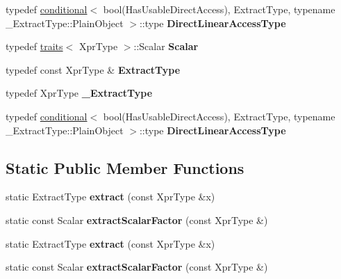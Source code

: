 \begin{DoxyCompactItemize}
typedef \hyperlink{struct_eigen_1_1internal_1_1conditional}{conditional}$<$ bool(Has\+Usable\+Direct\+Access), Extract\+Type, typename \+\_\+\+Extract\+Type\+::\+Plain\+Object $>$\+::type {\bfseries Direct\+Linear\+Access\+Type}
\item 
\mbox{\label{struct_eigen_1_1internal_1_1blas__traits_ac5b1b5ec7dfe61418c561674e47a5cdd}} 
typedef \hyperlink{struct_eigen_1_1internal_1_1traits}{traits}$<$ Xpr\+Type $>$\+::Scalar {\bfseries Scalar}
\item 
\mbox{\label{struct_eigen_1_1internal_1_1blas__traits_a63b33a3d263ccd7709cb758a560ab5b6}} 
typedef const Xpr\+Type \& {\bfseries Extract\+Type}
\item 
\mbox{\label{struct_eigen_1_1internal_1_1blas__traits_ada873c310e824caadb8bd690cac37316}} 
typedef Xpr\+Type {\bfseries \+\_\+\+Extract\+Type}
\item 
\mbox{\label{struct_eigen_1_1internal_1_1blas__traits_a6c3057fb89fc7a4257c3b06e9931438f}} 
typedef \hyperlink{struct_eigen_1_1internal_1_1conditional}{conditional}$<$ bool(Has\+Usable\+Direct\+Access), Extract\+Type, typename \+\_\+\+Extract\+Type\+::\+Plain\+Object $>$\+::type {\bfseries Direct\+Linear\+Access\+Type}
\end{DoxyCompactItemize}
\subsection*{Static Public Member Functions}
\begin{DoxyCompactItemize}
\item 
\mbox{\label{struct_eigen_1_1internal_1_1blas__traits_a05d6cd2ebeac5e92aee45db28b416023}} 
static Extract\+Type {\bfseries extract} (const Xpr\+Type \&x)
\item 
\mbox{\label{struct_eigen_1_1internal_1_1blas__traits_a49bf936917523bf20c00633e30787352}} 
static const Scalar {\bfseries extract\+Scalar\+Factor} (const Xpr\+Type \&)
\item 
\mbox{\label{struct_eigen_1_1internal_1_1blas__traits_a05d6cd2ebeac5e92aee45db28b416023}} 
static Extract\+Type {\bfseries extract} (const Xpr\+Type \&x)
\item 
\mbox{\label{struct_eigen_1_1internal_1_1blas__traits_a49bf936917523bf20c00633e30787352}} 
static const Scalar {\bfseries extract\+Scalar\+Factor} (const Xpr\+Type \&)
\end{DoxyCompactItemize}


